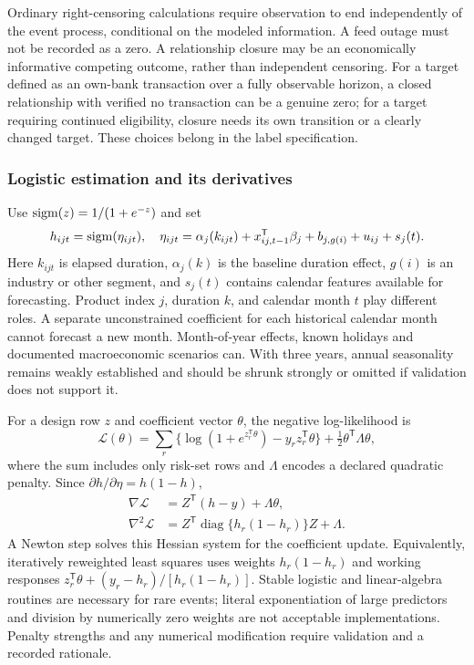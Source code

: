 Ordinary right-censoring calculations require observation to end independently of the event process, conditional on the modeled information. A feed outage must not be recorded as a zero. A relationship closure may be an economically informative competing outcome, rather than independent censoring. For a target defined as an own-bank transaction over a fully observable horizon, a closed relationship with verified no transaction can be a genuine zero; for a target requiring continued eligibility, closure needs its own transition or a clearly changed target. These choices belong in the label specification.

\subsubsection{Logistic estimation and its derivatives}

Use $\operatorname{sigm}(z)=1/(1+e^{-z})$ and set
\begin{equation}
 h_{ijt}=\operatorname{sigm}(\eta_{ijt}),\quad
 \eta_{ijt}=\alpha_j(k_{ijt})+x_{ij,t-1}^{\mathsf T}\beta_j
             +b_{j,g(i)}+u_{ij}+s_j(t).
 \label{eq:hazard-model}
\end{equation}
Here $k_{ijt}$ is elapsed duration, $\alpha_j(k)$ is the baseline duration effect, $g(i)$ is an industry or other segment, and $s_j(t)$ contains calendar features available for forecasting. Product index $j$, duration $k$, and calendar month $t$ play different roles. A separate unconstrained coefficient for each historical calendar month cannot forecast a new month. Month-of-year effects, known holidays and documented macroeconomic scenarios can. With three years, annual seasonality remains weakly established and should be shrunk strongly or omitted if validation does not support it.

For a design row $z$ and coefficient vector $\theta$, the negative log-likelihood is
\[
 \mathcal L(\theta)=\sum_r\{\log(1+e^{z_r^{\mathsf T}\theta})-y_rz_r^{\mathsf T}\theta\}
                       +\tfrac12\theta^{\mathsf T}\Lambda\theta,
\]
where the sum includes only risk-set rows and $\Lambda$ encodes a declared quadratic penalty. Since $\partial h/\partial\eta=h(1-h)$,
\begin{align}
 \nabla\mathcal L&=Z^{\mathsf T}(h-y)+\Lambda\theta,\label{eq:row-loglik}\\
 \nabla^2\mathcal L&=Z^{\mathsf T}\operatorname{diag}\{h_r(1-h_r)\}Z+\Lambda.
\end{align}
A Newton step solves this Hessian system for the coefficient update. Equivalently, iteratively reweighted least squares uses weights $h_r(1-h_r)$ and working responses $z_r^{\mathsf T}\theta+(y_r-h_r)/[h_r(1-h_r)]$. Stable logistic and linear-algebra routines are necessary for rare events; literal exponentiation of large predictors and division by numerically zero weights are not acceptable implementations. Penalty strengths and any numerical modification require validation and a recorded rationale.

